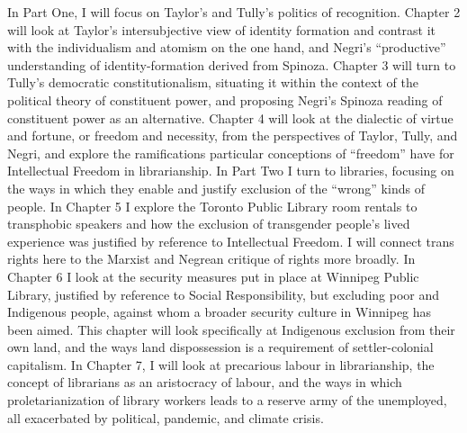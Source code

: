 \documentclass[12pt,oneside]{memoir}
\begin{document}
In Part One, I will focus on Taylor's and Tully's politics of recognition. Chapter 2 will look at Taylor's intersubjective view of identity formation and contrast it with the individualism and atomism on the one hand, and Negri's ``productive'' understanding of identity-formation derived from Spinoza. Chapter 3 will turn to Tully's democratic constitutionalism, situating it within the context of the political theory of constituent power, and proposing Negri's Spinoza reading of constituent power as an alternative. Chapter 4 will look at the dialectic of virtue and fortune, or freedom and necessity, from the perspectives of Taylor, Tully, and Negri, and explore the ramifications particular conceptions of ``freedom'' have for Intellectual Freedom in librarianship. In Part Two I turn to libraries, focusing on the ways in which they enable and justify exclusion of the ``wrong'' kinds of people. In Chapter 5 I explore the Toronto Public Library room rentals to transphobic speakers and how the exclusion of transgender people's lived experience was justified by reference to Intellectual Freedom. I will connect trans rights here to the Marxist and Negrean critique of rights more broadly. In Chapter 6 I look at the security measures put in place at Winnipeg Public Library, justified by reference to Social Responsibility, but excluding poor and Indigenous people, against whom a broader security culture in Winnipeg has been aimed. This chapter will look specifically at Indigenous exclusion from their own land, and the ways land dispossession is a requirement of settler-colonial capitalism. In Chapter 7, I will look at precarious labour in librarianship, the concept of librarians as an aristocracy of labour, and the ways in which proletarianization of library workers leads to a reserve army of the unemployed, all exacerbated by political, pandemic, and climate crisis. 









 


\backmatter

 

\end{document}
